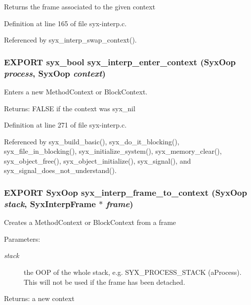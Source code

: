 Returns the frame associated to the given context 

Definition at line 165 of file syx-interp.c.

Referenced by syx\_\-interp\_\-swap\_\-context().\hypertarget{syx-interp_8h_9a508ea64c04f29c84de6c4a320c86f8}{
\subsubsection{\setlength{\rightskip}{0pt plus 5cm}EXPORT {\bf syx\_\-bool} syx\_\-interp\_\-enter\_\-context ({\bf SyxOop} {\em process}, \/  {\bf SyxOop} {\em context})}}
\label{syx-interp_8h_9a508ea64c04f29c84de6c4a320c86f8}


Enters a new MethodContext or BlockContext.

\begin{Desc}
\item[Returns:]FALSE if the context was syx\_\-nil \end{Desc}


Definition at line 271 of file syx-interp.c.

Referenced by syx\_\-build\_\-basic(), syx\_\-do\_\-it\_\-blocking(), syx\_\-file\_\-in\_\-blocking(), syx\_\-initialize\_\-system(), syx\_\-memory\_\-clear(), syx\_\-object\_\-free(), syx\_\-object\_\-initialize(), syx\_\-signal(), and syx\_\-signal\_\-does\_\-not\_\-understand().\hypertarget{syx-interp_8h_237d9e66928c5fb95a9b6e273512951e}{
\subsubsection{\setlength{\rightskip}{0pt plus 5cm}EXPORT {\bf SyxOop} syx\_\-interp\_\-frame\_\-to\_\-context ({\bf SyxOop} {\em stack}, \/  {\bf SyxInterpFrame} $\ast$ {\em frame})}}
\label{syx-interp_8h_237d9e66928c5fb95a9b6e273512951e}


Creates a MethodContext or BlockContext from a frame

\begin{Desc}
\item[Parameters:]
\begin{description}
\item[{\em stack}]the OOP of the whole stack, e.g. SYX\_\-PROCESS\_\-STACK (aProcess). This will not be used if the frame has been detached. \end{description}
\end{Desc}
\begin{Desc}
\item[Returns:]a new context \end{Desc}


